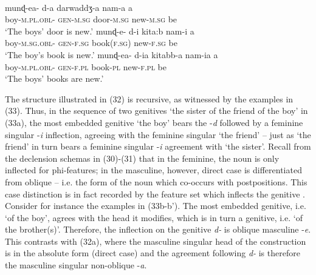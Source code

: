 \documentclass[output=paper]{langsci/langscibook}
\begin{document}
\ea%
    \label{ex:manzini:32}\\
    \begin{xlista}
    \ex
    \gll munɖ-ea-    d-a     darwaddʒ-a   nam-a   a\\
         boy-\textsc{m.pl.obl-}  \textsc{gen-m.sg}  door-\textsc{m.sg}  new-\textsc{m.sg}    be\\
    \glt ‘The boys’ door is new.’
    \ex  
    \gll munɖ-e-    d-i     kita:b     nam-i     a\\
         boy-\textsc{m.sg.obl-}  \textsc{gen-f.sg}   book(\textsc{f.sg)}   new-\textsc{f.sg}   be\\
    \glt ‘The boy’s book is new.’
    \gll munɖ-ea-    d-ia     kitabb-a   nam-ia   a\\
         boy-\textsc{m.pl.obl-}  \textsc{gen-f.pl}   book-\textsc{pl}   new-\textsc{f.pl}   be\\
    \glt ‘The boys’ books are new.’ 
    \end{xlista}
    \z

The structure illustrated in (32) is recursive, as witnessed by the examples in (33). Thus, in the sequence of two genitives ‘the sister of the friend of the boy’ in (33a), the most embedded genitive ‘the boy’ bears the -\textit{d}  followed by a feminine singular -\textit{i} inflection, agreeing with the feminine singular ‘the friend’ – just as ‘the friend’ in turn bears a feminine singular -\textit{i} agreement with ‘the sister’. Recall from the declension schemas in (30)-(31) that in the feminine, the noun is only inflected for phi-features; in the masculine, however, direct case is differentiated from oblique – i.e. the form of the noun which co-occurs with postpositions. This case distinction is in fact recorded by the feature set which inflects the genitive . Consider for instance the examples in (33b-b’). The most embedded genitive, i.e. ‘of the boy’, agrees with the head it modifies, which is in turn a genitive, i.e. ‘of the brother(s)’. Therefore, the inflection on the genitive  \textit{d-} is oblique masculine -\textit{e}. This contrasts with (32a), where the masculine singular head of the construction is in the absolute form (direct case) and the agreement following \textit{d-} is therefore the masculine singular non-oblique -\textit{a}.
\end{document}
